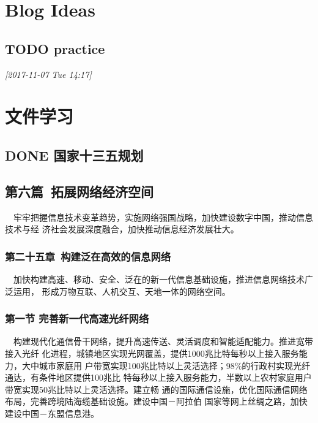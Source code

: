 \documentclass[11pt]{ctexart}
\begin{document}
{{{{\section{Blog Ideas}
\label{sec:org69e51c5}

\subsection{{\bfseries\sffamily TODO} practice}
\label{sec:org50c6c5c}

\textit{[2017-11-07 Tue 14:17]}

\section{文件学习}
\label{sec:org5a474e5}
\subsection{{\bfseries\sffamily DONE} 国家十三五规划}
\label{sec:orgea20531}
\subsection{第六篇 拓展网络经济空间 }
\label{sec:orgeb3188d}
  牢牢把握信息技术变革趋势，实施网络强国战略，加快建设数字中国，推动信息技术与经
济社会发展深度融合，加快推动信息经济发展壮大。


\subsubsection{第二十五章 构建泛在高效的信息网络 }
\label{sec:org7add1f7}

  加快构建高速、移动、安全、泛在的新一代信息基础设施，推进信息网络技术广泛运用，
形成万物互联、人机交互、天地一体的网络空间。

\subsubsection{第一节 完善新一代高速光纤网络 }
\label{sec:org9f467b8}

  构建现代化通信骨干网络，提升高速传送、灵活调度和智能适配能力。推进宽带接入光纤
化进程，城镇地区实现光网覆盖，提供1000兆比特每秒以上接入服务能力，大中城市家庭用
户带宽实现100兆比特以上灵活选择；98\%的行政村实现光纤通达，有条件地区提供100兆比
特每秒以上接入服务能力，半数以上农村家庭用户带宽实现50兆比特以上灵活选择。建立畅
通的国际通信设施，优化国际通信网络布局，完善跨境陆海缆基础设施。建设中国－阿拉伯
国家等网上丝绸之路，加快建设中国－东盟信息港。

}}}}
\end{document}

